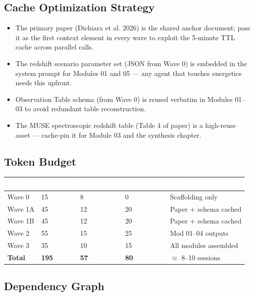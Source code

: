 \documentclass[11pt,letterpaper]{article}
\newcommand{\tableheader}[1]{\textbf{\sffamily\textcolor{white}{#1}}}
\begin{document}
\subsection{Cache Optimization Strategy}

\begin{itemize}[leftmargin=*]
  \item The primary paper (Dichiara et al. 2026) is the shared anchor document; pass it as the first context element in every wave to exploit the 5-minute TTL cache across parallel calls.
  \item The redshift scenario parameter set (JSON from Wave 0) is embedded in the system prompt for Modules 01 and 05 --- any agent that touches energetics needs this upfront.
  \item Observation Table schema (from Wave 0) is reused verbatim in Modules 01--03 to avoid redundant table reconstruction.
  \item The MUSE spectroscopic redshift table (Table 4 of paper) is a high-reuse asset --- cache-pin it for Module 03 and the synthesis chapter.
\end{itemize}

\subsection{Token Budget}

\begin{center}
\begin{tabularx}{\textwidth}{L{3cm}C{2cm}C{2cm}C{2cm}X}
\toprule
{}
\tableheader{Wave} & \tableheader{Input (k)} & \tableheader{Output (k)} & \tableheader{Cached (k)} & \tableheader{Notes} \\
\midrule
Wave 0 & 15 & 8 & 0 & Scaffolding only \\
Wave 1A & 45 & 12 & 20 & Paper + schema cached \\
Wave 1B & 45 & 12 & 20 & Paper + schema cached \\
Wave 2 & 55 & 15 & 25 & Mod 01--04 outputs \\
Wave 3 & 35 & 10 & 15 & All modules assembled \\
\midrule
\textbf{Total} & \textbf{195} & \textbf{57} & \textbf{80} & $\approx$ 8--10 sessions \\
\bottomrule
\end{tabularx}
\end{center}

\subsection{Dependency Graph}
\end{document}

